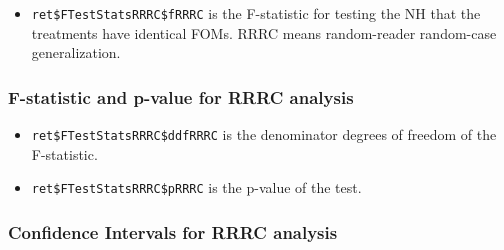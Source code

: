 \documentclass[]{book}
\newenvironment{Shaded}{\begin{snugshade}}{\end{snugshade}}
\newcommand{\CommentTok}[1]{\textcolor[rgb]{0.56,0.35,0.01}{\textit{#1}}}
\newcommand{\NormalTok}[1]{#1}
\newcommand{\OperatorTok}[1]{\textcolor[rgb]{0.81,0.36,0.00}{\textbf{#1}}}
\providecommand{\tightlist}{%
  \setlength{\itemsep}{0pt}\setlength{\parskip}{0pt}}
\begin{document}
\begin{itemize}
\tightlist
\item
  \texttt{ret\$FTestStatsRRRC\$fRRRC} is the F-statistic for testing the NH that the
  treatments have identical FOMs. RRRC means random-reader random-case generalization.
\end{itemize}

\begin{Shaded}
\end{Shaded}

\hypertarget{f-statistic-and-p-value-for-rrrc-analysis}{%
\subsubsection{F-statistic and p-value for RRRC analysis}\label{f-statistic-and-p-value-for-rrrc-analysis}}

\begin{itemize}
\tightlist
\item
  \texttt{ret\$FTestStatsRRRC\$ddfRRRC} is the denominator degrees of freedom of the F-statistic.
\end{itemize}

\begin{Shaded}
\end{Shaded}

\begin{itemize}
\tightlist
\item
  \texttt{ret\$FTestStatsRRRC\$pRRRC} is the p-value of the test.
\end{itemize}

\begin{Shaded}
\end{Shaded}

\hypertarget{confidence-intervals-for-rrrc-analysis}{%
\subsubsection{Confidence Intervals for RRRC analysis}\label{confidence-intervals-for-rrrc-analysis}}
\end{document}
